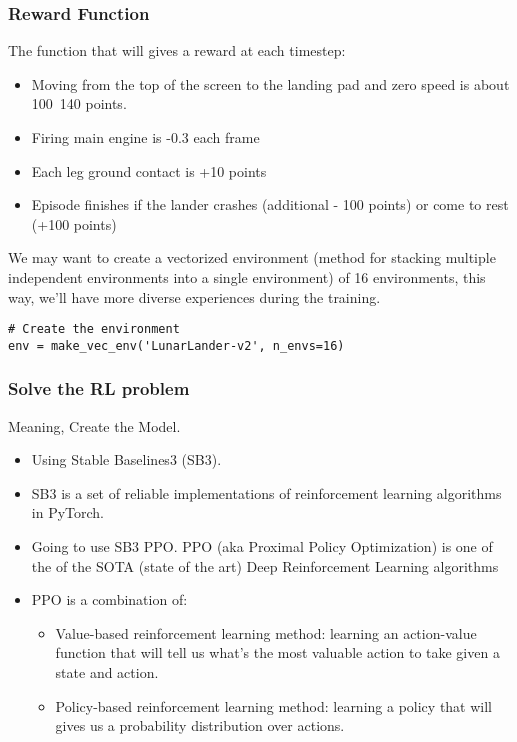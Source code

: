 \begin{frame}[fragile]\frametitle{Reward Function}

The function that will gives a reward at each timestep:

\begin{itemize}
\item Moving from the top of the screen to the landing pad and zero speed is about 100~140 points.
\item Firing main engine is -0.3 each frame
\item Each leg ground contact is +10 points
\item Episode finishes if the lander crashes (additional - 100 points) or come to rest (+100 points)
\end{itemize}

We may want to create a vectorized environment (method for stacking multiple independent environments into a single environment) of 16 environments, this way, we'll have more diverse experiences during the training.

\begin{lstlisting}
# Create the environment
env = make_vec_env('LunarLander-v2', n_envs=16)
\end{lstlisting}

\end{frame}

\begin{frame}[fragile]\frametitle{Solve the RL problem}

Meaning, Create the Model.
 
\begin{itemize}
\item Using Stable Baselines3 (SB3).
\item SB3 is a set of reliable implementations of reinforcement learning algorithms in PyTorch.
\item Going to use SB3 PPO. PPO (aka Proximal Policy Optimization) is one of the of the SOTA (state of the art) Deep Reinforcement Learning algorithms
\item PPO is a combination of:
	\begin{itemize}
	\item Value-based reinforcement learning method: learning an action-value function that will tell us what's the most valuable action to take given a state and action.
	\item Policy-based reinforcement learning method: learning a policy that will gives us a probability distribution over actions.
	\end{itemize}

\end{itemize}

\end{frame}

